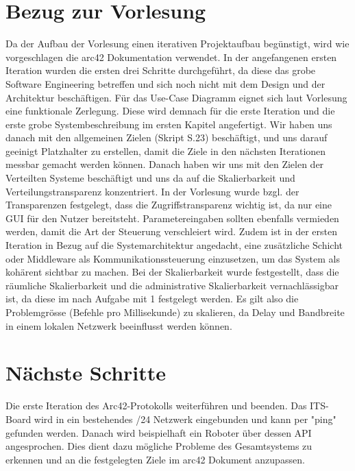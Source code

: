 \documentclass{article}
\begin{document}
\section{Bezug zur Vorlesung}
Da der Aufbau der Vorlesung einen iterativen Projektaufbau begünstigt, wird wie vorgeschlagen die arc42 Dokumentation verwendet. In der angefangenen ersten Iteration wurden die ersten drei Schritte durchgeführt, da diese das grobe Software Engineering betreffen und sich noch nicht mit dem Design und der Architektur beschäftigen. Für das Use-Case Diagramm eignet sich laut Vorlesung eine funktionale Zerlegung. Diese wird demnach für die erste Iteration und die erste grobe Systembeschreibung im ersten Kapitel angefertigt. Wir haben uns danach mit den allgemeinen Zielen (Skript S.23) beschäftigt, und uns darauf geeinigt Platzhalter zu erstellen, damit die Ziele in den nächsten Iterationen messbar gemacht werden können. Danach haben wir uns mit den Zielen der Verteilten Systeme beschäftigt und uns da auf die Skalierbarkeit und Verteilungstransparenz konzentriert. In der Vorlesung wurde bzgl. der Transparenzen festgelegt, dass die Zugriffstransparenz wichtig ist, da nur eine GUI für den Nutzer bereitsteht. Parametereingaben sollten ebenfalls vermieden werden, damit die Art der Steuerung verschleiert wird. Zudem ist in der ersten Iteration in Bezug auf die Systemarchitektur angedacht, eine zusätzliche Schicht oder Middleware als Kommunikationssteuerung einzusetzen, um das System als kohärent sichtbar zu machen. Bei der Skalierbarkeit wurde festgestellt, dass die räumliche Skalierbarkeit und die administrative Skalierbarkeit vernachlässigbar ist, da diese im nach Aufgabe mit 1 festgelegt werden. Es gilt also die Problemgrösse (Befehle pro Millisekunde) zu skalieren, da Delay und Bandbreite in einem lokalen Netzwerk beeinflusst werden können. 

\section{Nächste Schritte}
Die erste Iteration des Arc42-Protokolls weiterführen und beenden.
Das ITS-Board wird in ein bestehendes /24 Netzwerk eingebunden und kann per "ping" gefunden werden. Danach wird beispielhaft ein Roboter über dessen API angesprochen. Dies dient dazu mögliche Probleme des Gesamtsystems zu erkennen und an die festgelegten Ziele im arc42 Dokument anzupassen.
\end{document}
